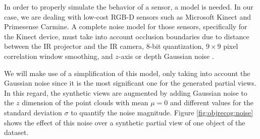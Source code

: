 In order to properly simulate the behavior of a sensor, a model is needed. In our case, we are dealing with low-cost \acs{RGB-D} sensors such as Microsoft Kinect and Primesense Carmine. A complete noise model for those sensors, specifically for the Kinect device, must take into account occlusion boundaries due to distance between the \ac{IR} projector and the \ac{IR} camera, $8$-bit quantization, $9\times9$ pixel correlation window smoothing, and $z$-axis or depth Gaussian noise \cite{Gschwandtner2011}.

We will make use of a simplification of this model, only taking into account the Gaussian noise since it is the most significant one for the generated partial views. In this regard, the synthetic views are augmented by adding Gaussian noise to the $z$ dimension of the point clouds with mean $\mu=0$ and different values for the standard deviation $\sigma$ to quantify the noise magnitude. Figure \ref{fig:objrecog:noise} shows the effect of this noise over a synthetic partial view of one object of the dataset.

